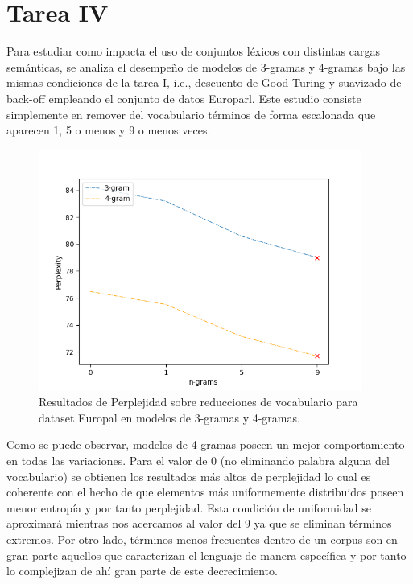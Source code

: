 \documentclass[11pt,a4paper]{report}
\begin{document}
	\section*{Tarea IV}
	
	\noindent Para estudiar como impacta el uso de conjuntos léxicos con distintas cargas semánticas, se analiza el desempeño de modelos de 3-gramas y 4-gramas bajo las mismas condiciones de la tarea I, i.e., descuento de Good-Turing y suavizado de back-off empleando el conjunto de datos Europarl. Este estudio consiste simplemente en remover del vocabulario términos de forma escalonada que aparecen 1, 5 o menos y 9 o menos veces. 
	
	\begin{figure}[!thb]
		\begin{center}
			\includegraphics[width=300pt]{images/t4.png}
		\end{center}
		\caption{Resultados de Perplejidad sobre reducciones de vocabulario para dataset Europal en modelos de 3-gramas y 4-gramas.}
	\end{figure}

	\noindent Como se puede observar, modelos de 4-gramas poseen un mejor comportamiento en todas las variaciones. Para el valor de 0 (no eliminando palabra alguna del vocabulario) se obtienen los resultados más altos de perplejidad lo cual es coherente con el hecho de que elementos más uniformemente distribuidos poseen menor entropía y por tanto perplejidad. Esta condición de uniformidad se aproximará mientras nos acercamos al valor del 9 ya que se eliminan términos extremos. Por otro lado, términos menos frecuentes dentro de un corpus son en gran parte aquellos que caracterizan el lenguaje de manera específica y por tanto lo complejizan de ahí gran parte de este decrecimiento.
	
\end{document}
